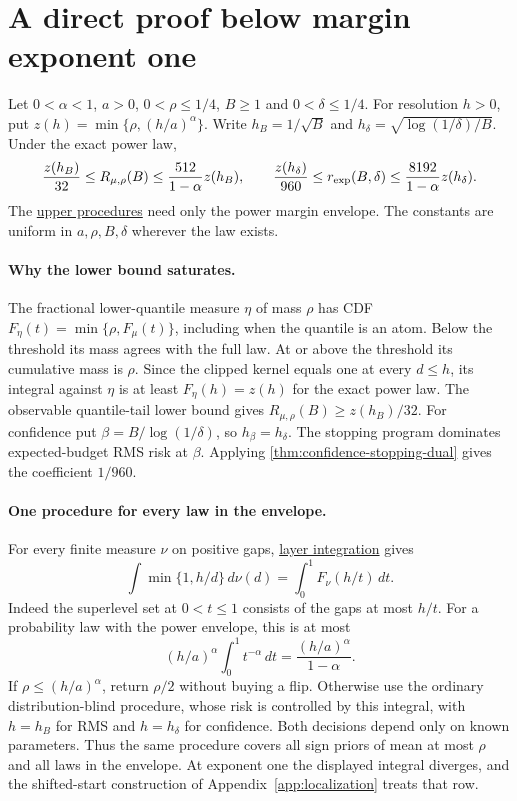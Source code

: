 \section{A direct proof below margin exponent one}\label{app:sublinear-power}

Let $0<\alpha<1$, $a>0$, $0<\rho\le1/4$, $B\ge1$ and
$0<\delta\le1/4$. For resolution $h>0$, put
$z(h)=\min\{\rho,(h/a)^\alpha\}$. Write $h_B=1/\sqrt B$ and
$h_\delta=\sqrt{\log(1/\delta)/B}$. Under the exact power law,
\[
 \frac{z(h_B)}{32}\le R_{\mu,\rho}(B)\le
 \frac{512}{1-\alpha}z(h_B),\qquad
 \frac{z(h_\delta)}{960}\le r_{\rm exp}(B,\delta)\le
 \frac{8192}{1-\alpha}z(h_\delta).
\]
The \href{https://github.com/davidiach/adaptive-threshold-estimation/blob/b0c197402f9623cf845f732582fe21f7e9159d9f/lean/ThresholdHC/SubcriticalPower/Upper.lean}{upper procedures} need only the power margin envelope. The constants
are uniform in $a,\rho,B,\delta$ wherever the law exists.

\paragraph{Why the lower bound saturates.}
The fractional lower-quantile measure $\eta$ of mass $\rho$ has CDF
$F_\eta(t)=\min\{\rho,F_\mu(t)\}$, including when the quantile is an
atom. Below the threshold its mass agrees with the full law. At or above
the threshold its cumulative mass is $\rho$. Since the clipped kernel
equals one at every $d\le h$, its integral against $\eta$ is at least
$F_\eta(h)=z(h)$ for the exact power law. The observable quantile-tail
lower bound gives $R_{\mu,\rho}(B)\ge z(h_B)/32$.
For confidence put $\beta=B/\log(1/\delta)$, so $h_\beta=h_\delta$.
The stopping program dominates expected-budget RMS risk at $\beta$.
Applying \cref{thm:confidence-stopping-dual} gives the coefficient $1/960$.

\paragraph{One procedure for every law in the envelope.}
For every finite measure $\nu$ on positive gaps,
\href{https://github.com/davidiach/adaptive-threshold-estimation/blob/72c56e0f37d72c8464ac35290181715152aa2450/lean/ThresholdHC/SubcriticalPower/Layers.lean}{layer integration} gives
\[
 \int\min\{1,h/d\}\,d\nu(d)=\int_0^1 F_\nu(h/t)\,dt.
\]
Indeed the superlevel set at $0<t\le1$ consists of the gaps at most $h/t$.
For a probability law with the power envelope, this is at most
\[
 (h/a)^\alpha\int_0^1t^{-\alpha}\,dt
   =\frac{(h/a)^\alpha}{1-\alpha}.
\]
If $\rho\le(h/a)^\alpha$, return $\rho/2$ without buying a flip.
Otherwise use the ordinary distribution-blind procedure, whose risk
is controlled by this integral, with $h=h_B$ for RMS and $h=h_\delta$
for confidence. Both decisions depend only on known parameters. Thus the
same procedure covers all sign priors of mean at most $\rho$ and all laws
in the envelope. At exponent one the displayed integral diverges, and the
shifted-start construction of Appendix~\ref{app:localization} treats that row.
